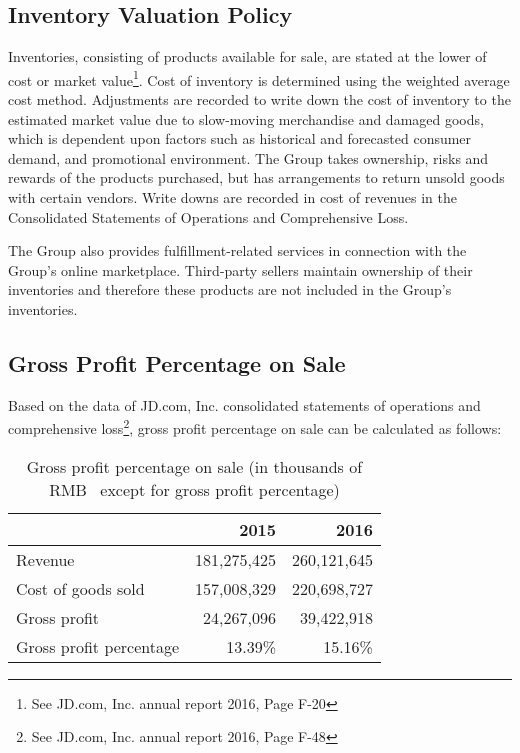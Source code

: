 \subsection{Inventory Valuation Policy}
Inventories, consisting of products available for sale, are stated at the lower of cost or market value\footnote{See JD.com, Inc. annual report 2016, Page F-20}. Cost of inventory is determined using the weighted
average cost method. Adjustments are recorded to write down the cost of inventory to the estimated market value due to slow-moving merchandise and
damaged goods, which is dependent upon factors such as historical and forecasted consumer demand, and promotional environment. The Group takes
ownership, risks and rewards of the products purchased, but has arrangements to return unsold goods with certain vendors. Write downs are recorded in cost of
revenues in the Consolidated Statements of Operations and Comprehensive Loss.

The Group also provides fulfillment-related services in connection with the Group’s online marketplace. Third-party sellers maintain ownership of their
inventories and therefore these products are not included in the Group’s inventories.
\subsection{Gross Profit Percentage on Sale}

Based on the data of JD.com, Inc. consolidated statements of operations and comprehensive loss\footnote{See JD.com, Inc. annual report 2016, Page F-48}, gross profit percentage on sale can be calculated as follows:

\begin{table}[H]	
	\begin{center}
		\begin{tabular}{lrr}
			\toprule
			&\textbf{2015}&\textbf{2016}\\
			\midrule
			Revenue&181,275,425&260,121,645\\
			Cost of goods sold&157,008,329&220,698,727\\
			Gross profit&24,267,096&39,422,918\\
			Gross profit percentage&13.39\%&15.16\%\\
			\bottomrule
		\end{tabular}
	\end{center}
	\caption{Gross profit percentage on sale (in thousands of RMB \textyen\ except for gross profit percentage)}\label{table:1}
\end{table}

